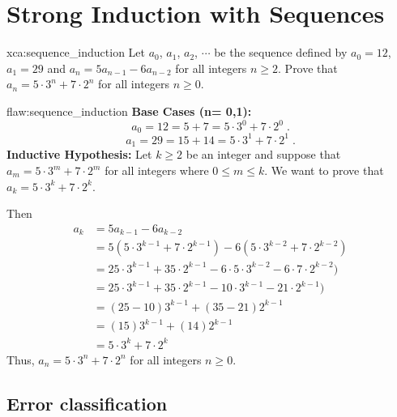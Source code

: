 \section{Strong Induction with Sequences}

\begin{xca}{xca:sequence_induction}
Let $a_0$, $a_1$, $a_2$, $\cdots$ be the sequence defined by $a_0=12$, $a_1=29$ and $a_n = 5a_{n-1} - 6a_{n-2}$ for all integers $n \geq 2$. Prove that $a_n = 5\cdot3^n + 7\cdot 2^n$ for all integers $n \geq 0$.
\end{xca}

\begin{flaw}{flaw:sequence_induction} %
\textbf{Base Cases (n= 0,1):} 
$$a_0 = 12 = 5 + 7 = 5 \cdot 3^0 + 7\cdot 2^0\;.$$
$$a_1 = 29 = 15 + 14 = 5 \cdot 3^1 + 7\cdot 2^1\;.$$
\textbf{Inductive Hypothesis:} Let $k \geq 2$ be an integer and suppose that 
$a_m = 5\cdot3^m + 7\cdot 2^m$ for all integers where $0 \leq m \leq k.$ We want to prove that $a_k = 5\cdot3^k + 7\cdot 2^k$. 

Then \begin{align*}
    a_k &= 5a_{k-1} - 6a_{k-2} \\
    &= 5(5\cdot3^{k-1} + 7\cdot 2^{k-1}) - 6(5\cdot3^{k-2} + 7\cdot 2^{k-2}) \\
    &= 25\cdot3^{k-1} + 35\cdot 2^{k-1} - 6\cdot 5\cdot3^{k-2} - 6\cdot 7\cdot 2^{k-2}) \\
    &= 25\cdot3^{k-1} + 35\cdot 2^{k-1} - 10\cdot3^{k-1} - 21\cdot 2^{k-1}) \\
    &=(25 - 10)3^{k-1} + (35-21) 2^{k-1} \\
    &= (15)3^{k-1} + (14) 2^{k-1} \\
    &= 5\cdot3^k + 7\cdot 2^k
\end{align*}
Thus, 
$a_n = 5\cdot3^n + 7\cdot 2^n$ for all integers $n \geq 0$.
\end{flaw}

\clearpage
\subsection{Error classification}

